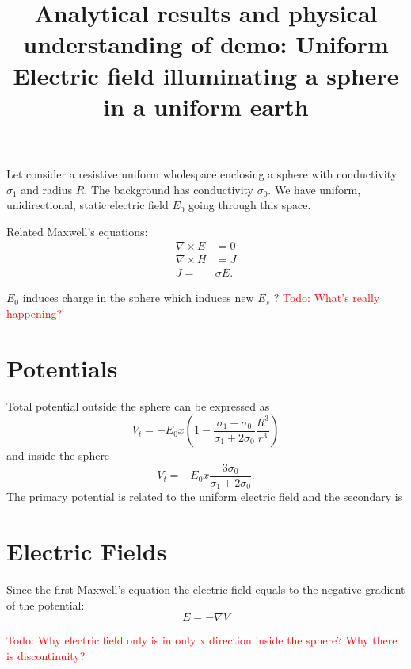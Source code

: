 \documentclass[11pt,letterpaper,leqno]{amsart}
\title{Analytical results and physical understanding of demo: Uniform Electric field illuminating a sphere in a uniform earth}
\newcommand{\TODO}[1]{\textcolor{red}{{\sc Todo:} #1}}
\numberwithin{equation}{section}
\begin{document}
\maketitle
\thispagestyle{empty}




\normalsize

\vspace{0.4cm}


Let consider a resistive uniform wholespace enclosing a sphere with conductivity $\sigma_1$ and radius $R$.  The background has conductivity $\sigma_0$. We have uniform, unidirectional, static electric field $E_0$ going through this space.

Related Maxwell's equations: 
\begin{equation}
\begin{aligned}
  \nabla \times E & = 0 \\
  \nabla\times H & = J \\
  J  =&  \sigma E.
\end{aligned}
\end{equation}

$E_0$ induces charge in the sphere which induces  new $E_s$  ?
\TODO{What's really happening? }

\section{Potentials}

Total potential outside the sphere can be expressed as   
\begin{equation}
V_t  = -E_0x (1-\frac{\sigma_1-\sigma_0}{\sigma_1+2\sigma_0} \frac{R^3}{r^3})
\end{equation}
and inside the sphere
\begin{equation}
 V_t= -E_0 x\frac{3 \sigma_0}{\sigma_1+2\sigma_0}.
 \end{equation}
The primary potential is related to the uniform electric field and the secondary is 

\section{Electric Fields}
Since the first Maxwell's equation the electric field equals to the negative gradient of the potential:
\begin{equation}
E = -\nabla V
\end{equation}

\TODO{Why electric field only is in only x direction inside the sphere? Why there is discontinuity?}
 
\end{document}
